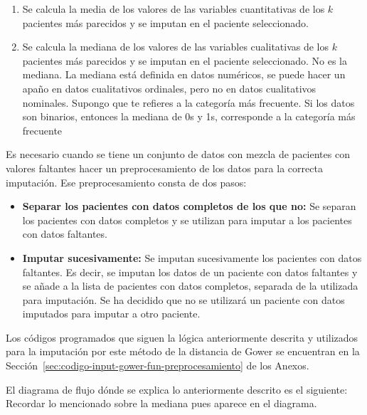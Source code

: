 \begin{enumerate}
    \item Se calcula la media de los valores de las variables cuantitativas de los $k$ pacientes más parecidos y se imputan en el paciente seleccionado.
    \item Se calcula la {\color{red} mediana} de los valores de las variables cualitativas de los $k$ pacientes más parecidos y se imputan en el paciente seleccionado. {\color{blue} No es la mediana. La mediana está definida en datos numéricos, se puede hacer un apaño en datos cualitativos ordinales, pero no en datos cualitativos nominales. Supongo que te refieres a la categoría más frecuente. Si los datos son binarios, entonces la mediana de 0s y 1s, corresponde a la categoría más frecuente}
\end{enumerate}

Es necesario cuando se tiene un conjunto de datos con mezcla de pacientes con valores faltantes hacer un preprocesamiento de los datos para la correcta imputación. Ese preprocesamiento consta de dos pasos: 
\begin{itemize}
    \item \textbf{Separar los pacientes con datos completos de los que no:} Se separan los pacientes con datos completos y se utilizan para imputar a los pacientes con datos faltantes.
    \item \textbf{Imputar sucesivamente:} Se imputan sucesivamente los pacientes con datos faltantes. Es decir, se imputan los datos de un paciente con datos faltantes y se añade a la lista de pacientes con datos completos, separada de la utilizada para imputación. Se ha decidido que no se utilizará un paciente con datos imputados para imputar a otro paciente.
\end{itemize}

Los códigos programados que siguen la lógica anteriormente descrita y utilizados para la imputación por este método de la distancia de Gower se encuentran en la Sección~\ref{sec:codigo-input-gower-fun-preprocesamiento} de los Anexos.

El diagrama de flujo dónde se explica lo anteriormente descrito es el siguiente: {\color{blue} Recordar lo mencionado sobre la mediana pues aparece en el diagrama.}

\newpage
\thispagestyle{empty}

